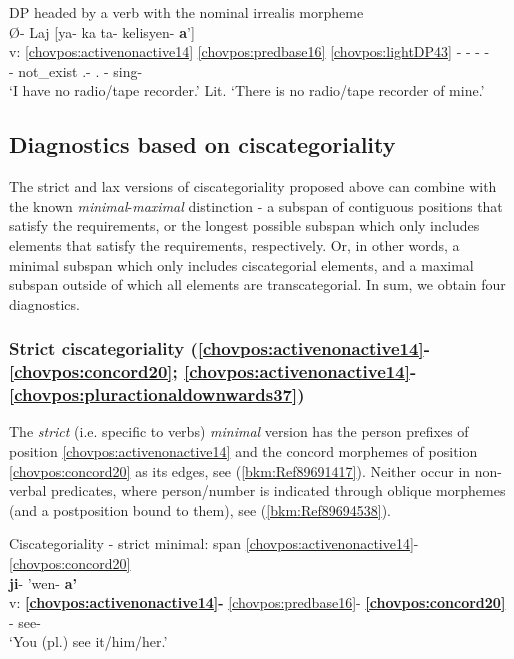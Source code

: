 \documentclass[output=paper]{langscibook}
\begin{document}
\ea\label{bkm:Ref89643749} DP headed by a verb with the nominal irrealis morpheme\\
\glll {} Ø{}- Laj [ya{}- ka ta{}- kelisyen{}- \textbf{a}']\\
v: \ref{chovpos:activenonactive14} \ref{chovpos:predbase16} \ref{chovpos:lightDP43} - - - - \\ 
{} \Third{}- not\_exist \First\Sg.\Poss{}- \Ali.\Poss{} \Third{}- sing- \textbf{\Irr{}}\\
\glt `I have no radio/tape recorder.' Lit. `There is no radio/tape recorder of mine.'
\z 

\subsection{Diagnostics based on ciscategoriality}
\label{bkm:Ref90249662}
The strict and lax versions of ciscategoriality proposed above can combine with the known \textit{minimal}{}-\textit{maximal} distinction - a subspan of contiguous positions that satisfy the requirements, or the longest possible subspan which only includes elements that satisfy the requirements, respectively. Or, in other words, a minimal subspan which only includes ciscategorial elements, and a maximal subspan outside of which all elements are transcategorial. In sum, we obtain four diagnostics.

\subsubsection{Strict ciscategoriality (\ref{chovpos:activenonactive14}{}-\ref{chovpos:concord20}; \ref{chovpos:activenonactive14}{}-\ref{chovpos:pluractionaldownwards37})}

The \textit{strict} (i.e. specific to verbs) \textit{minimal} version has the person prefixes of position \ref{chovpos:activenonactive14} and the concord morphemes of position \ref{chovpos:concord20} as its edges, see (\ref{bkm:Ref89691417}). Neither occur in non-verbal predicates, where person/number is indicated through oblique morphemes (and a postposition bound to them), see (\ref{bkm:Ref89694538}).

\ea\label{bkm:Ref89691417} Ciscategoriality - strict minimal: span \ref{chovpos:activenonactive14}{}-\ref{chovpos:concord20} \\ 
\glll {} \textbf{ji}{}- 'wen- \textbf{a'}\\
    v: \textbf{\ref{chovpos:activenonactive14}-} \ref{chovpos:predbase16}-      \textbf{\ref{chovpos:concord20}}\\ 
    {} \Second{}- see- \Second\Pl{}\\
\glt `You (pl.) see it/him/her.'
\z 
\end{document}
